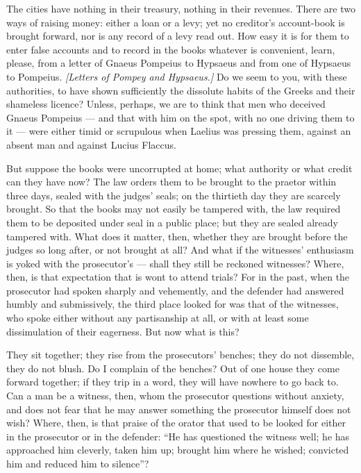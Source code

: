  The cities have nothing in their treasury, nothing in their revenues. There are two ways of raising money: either a loan or a levy; yet no creditor's account-book is brought forward, nor is any record of a levy read out. How easy it is for them to enter false accounts and to record in the books whatever is convenient, learn, please, from a letter of Gnaeus Pompeius to Hypsaeus and from one of Hypsaeus to Pompeius. \textit{[Letters of Pompey and Hypsaeus.]} Do we seem to you, with these authorities, to have shown sufficiently the dissolute habits of the Greeks and their shameless licence? Unless, perhaps, we are to think that men who deceived Gnaeus Pompeius --- and that with him on the spot, with no one driving them to it --- were either timid or scrupulous when Laelius was pressing them, against an absent man and against Lucius Flaccus.

 But suppose the books were uncorrupted at home; what authority or what credit can they have now? The law orders them to be brought to the praetor within three days, sealed with the judges' seals; on the thirtieth day they are scarcely brought. So that the books may not easily be tampered with, the law required them to be deposited under seal in a public place; but they are sealed already tampered with. What does it matter, then, whether they are brought before the judges so long after, or not brought at all? And what if the witnesses' enthusiasm is yoked with the prosecutor's --- shall they still be reckoned witnesses? Where, then, is that expectation that is wont to attend trials? For in the past, when the prosecutor had spoken sharply and vehemently, and the defender had answered humbly and submissively, the third place looked for was that of the witnesses, who spoke either without any partisanship at all, or with at least some dissimulation of their eagerness. But now what is this?

 They sit together; they rise from the prosecutors' benches; they do not dissemble, they do not blush. Do I complain of the benches? Out of one house they come forward together; if they trip in a word, they will have nowhere to go back to. Can a man be a witness, then, whom the prosecutor questions without anxiety, and does not fear that he may answer something the prosecutor himself does not wish? Where, then, is that praise of the orator that used to be looked for either in the prosecutor or in the defender: ``He has questioned the witness well; he has approached him cleverly, taken him up; brought him where he wished; convicted him and reduced him to silence''?

